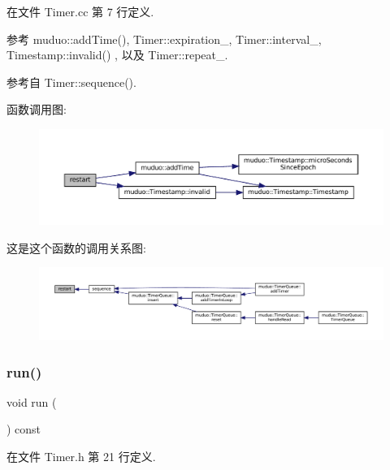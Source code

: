 在文件 Timer.\+cc 第 7 行定义.



参考 muduo\+::add\+Time(), Timer\+::expiration\+\_\+, Timer\+::interval\+\_\+, Timestamp\+::invalid() , 以及 Timer\+::repeat\+\_\+.



参考自 Timer\+::sequence().

函数调用图\+:
\nopagebreak
\begin{figure}[H]
\begin{center}
\leavevmode
\includegraphics[width=350pt]{classmuduo_1_1Timer_af96f08cc8d7b3f18df9ce1a305d56ae9_cgraph}
\end{center}
\end{figure}
这是这个函数的调用关系图\+:
\nopagebreak
\begin{figure}[H]
\begin{center}
\leavevmode
\includegraphics[width=350pt]{classmuduo_1_1Timer_af96f08cc8d7b3f18df9ce1a305d56ae9_icgraph}
\end{center}
\end{figure}
\mbox{\label{classmuduo_1_1Timer_aa6b7bb009af6cd63f442559d3b8d1ab2}} 
\subsubsection{\texorpdfstring{run()}{run()}}
{\footnotesize\ttfamily void run (\begin{DoxyParamCaption}{ }\end{DoxyParamCaption}) const\hspace{0.3cm}{\ttfamily [inline]}}



在文件 Timer.\+h 第 21 行定义.



